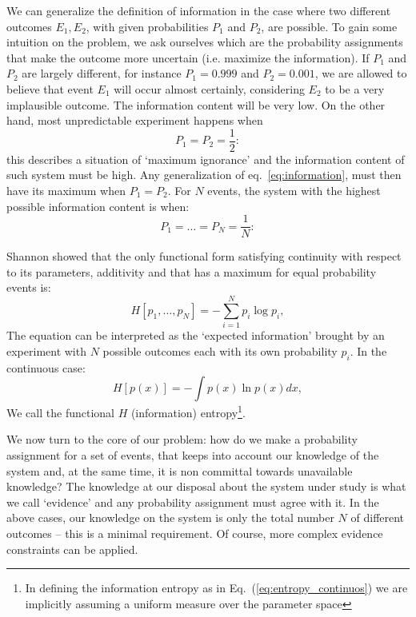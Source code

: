 \documentclass[twocolumn,showpacs,preprintnumbers,nofootinbib,prd,
superscriptaddress,10pt]{revtex4-1}
\begin{document}
We can generalize the definition of information in the case where two different outcomes $E_1, E_2$, with given probabilities $P_1$ and $P_2$, are possible.
To gain some intuition on the problem, we ask ourselves which are the probability assignments that make the outcome more uncertain (i.e. maximize the information).
If $P_1$ and $P_2$ are largely different, for instance $P_1 = 0.999$ and $P_2 = 0.001$, we are allowed to believe that event $E_1$ will occur almost certainly, considering $E_2$ to be a very implausible outcome. The information content will be very low.
On the other hand, most unpredictable experiment happens when 
\begin{equation}\nonumber
    P_1 = P_2 = \frac{1}{2}:
\end{equation}
this describes a situation of `maximum ignorance' and the information content of such system must be high.
Any generalization of eq.~\eqref{eq:information}, must then have its maximum when $ P_1 = P_2$.
For $N$ events, the system with the highest possible information content is when:
\begin{equation}\nonumber
    P_1 = \hdots = P_N = \frac{1}{N}:
\end{equation}

Shannon \cite{Shannon} showed that the only functional form satisfying continuity with respect to its parameters, additivity and that has a maximum for equal probability events is:
\begin{equation}\label{eq:entropy}
    H[p_1, \dots, p_N] = - \sum_{i = 1}^N p_i\log{p_i},
\end{equation}
The equation can be interpreted as the `expected information' brought by an experiment with $N$ possible outcomes each with its own probability $p_i$.
In the continuous case:
\begin{equation} \label{eq:entropy_continuos}
    H[p(x)] = - \int p(x)\ln p(x) dx,
\end{equation}
We call the functional $H$ (information) entropy\footnote{In defining the information entropy as in Eq.~(\ref{eq:entropy_continuos}) we are implicitly assuming a uniform measure over the parameter space}.

We now turn to the core of our problem: how do we make a probability assignment for a set of events, that keeps into account our knowledge of the system and, at the same time, it is non committal towards unavailable knowledge?
The knowledge at our disposal about the system under study is what we call `evidence' and any probability assignment must agree with it.
In the above cases, our knowledge on the system is only the total number $N$ of different outcomes -- this is a minimal requirement. Of course, more complex evidence constraints can be applied.
\end{document}
